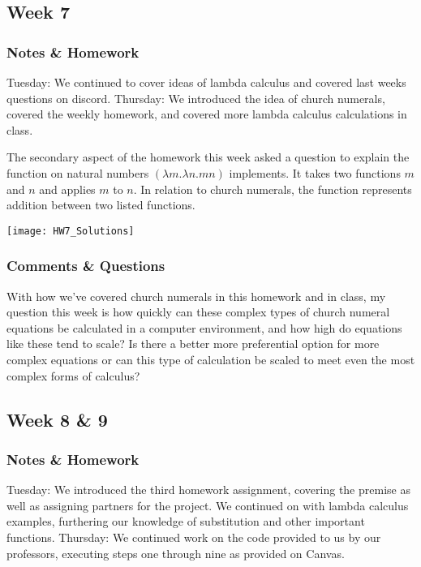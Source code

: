 \documentclass{article}
\theoremstyle{theorem}
\theoremstyle{definition}
\theoremstyle{remark}
\begin{document}
  \subsection{Week 7}

  \subsubsection{Notes \& Homework}
    Tuesday: We continued to cover ideas of lambda calculus and covered last weeks questions on discord. 
    \newline Thursday: We introduced the idea of church numerals, covered the weekly homework, and covered more lambda calculus calculations in class.

    The secondary aspect of the homework this week asked a question to explain the function on natural numbers $(\lambda m. \lambda n. m n)$ implements. It takes two functions $m$ and $n$ and applies $m$ to $n$. In relation to church numerals, the function represents addition between two listed functions. 

  \begin{center} \texttt{[image: HW7\_Solutions]} \end{center}

  \subsubsection{Comments \& Questions}
    With how we've covered church numerals in this homework and in class, my question this week is how quickly can these complex types of church numeral equations be calculated in a computer environment, and how high do equations like these tend to scale? Is there a better more preferential option for more complex equations or can this type of calculation be scaled to meet even the most complex forms of calculus?

  \subsection{Week 8 \& 9}

  \subsubsection{ Notes \& Homework}
    Tuesday: We introduced the third homework assignment, covering the premise as well as assigning partners for the project. We continued on with lambda calculus examples, furthering our knowledge of substitution and other important functions.
    \newline Thursday: We continued work on the code provided to us by our professors, executing steps one through nine as provided on Canvas.
\end{document}
